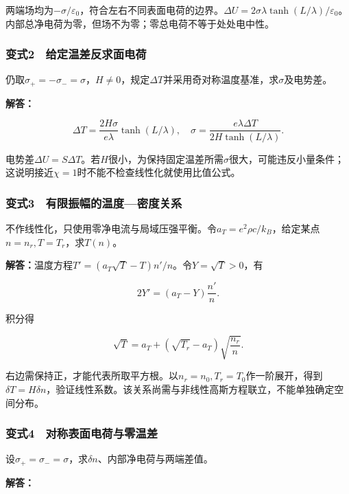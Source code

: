 \documentclass[12pt,a4paper,fontset=fandol]{ctexart}
\begin{document}
两端场均为\(-\sigma/\varepsilon_0\)，符合左右不同表面电荷的边界。\(\Delta U=2\sigma\lambda\tanh(L/\lambda)/\varepsilon_0\)。内部总净电荷为零，但场不为零；零总电荷不等于处处电中性。

\subsubsection{变式2　给定温差反求面电荷}\label{ux53d8ux5f0f2-ux7ed9ux5b9aux6e29ux5deeux53cdux6c42ux9762ux7535ux8377}

仍取\(\sigma_+=-\sigma_-=\sigma\)，\(H\neq0\)，规定\(\Delta T\)并采用奇对称温度基准，求\(\sigma\)及电势差。

\textbf{解答：}

\[
\Delta T=\frac{2H\sigma}{e\lambda}\tanh(L/\lambda),
\quad
\sigma=\frac{e\lambda\Delta T}{2H\tanh(L/\lambda)}.
\]

电势差\(\Delta U=S\Delta T\)。若\(H\)很小，为保持固定温差所需\(\sigma\)很大，可能违反小量条件；这说明接近\(\chi=1\)时不能不检查线性化就使用比值公式。

\subsubsection{变式3　有限振幅的温度---密度关系}\label{ux53d8ux5f0f3-ux6709ux9650ux632fux5e45ux7684ux6e29ux5ea6ux5bc6ux5ea6ux5173ux7cfb}

不作线性化，只使用零净电流与局域压强平衡。令\(a_T=e^2\rho c/k_B\)，给定某点\(n=n_r,T=T_r\)，求\(T(n)\)。

\textbf{解答：}温度方程\(T'=(a_T\sqrt T-T)n'/n\)。令\(Y=\sqrt T>0\)，有

\[
2Y'=(a_T-Y)\frac{n'}n.
\]

积分得

\[
\boxed{\sqrt T=a_T+(\sqrt{T_r}-a_T)\sqrt{\frac{n_r}{n}}}.
\]

右边需保持正，才能代表所取平方根。以\(n_r=n_0,T_r=T_0\)作一阶展开，得到\(\delta T=H\delta n\)，验证线性系数。该关系尚需与非线性高斯方程联立，不能单独确定空间分布。

\subsubsection{变式4　对称表面电荷与零温差}\label{ux53d8ux5f0f4-ux5bf9ux79f0ux8868ux9762ux7535ux8377ux4e0eux96f6ux6e29ux5dee}

设\(\sigma_+=\sigma_-=\sigma\)，求\(\delta n\)、内部净电荷与两端差值。

\textbf{解答：}
\end{document}
